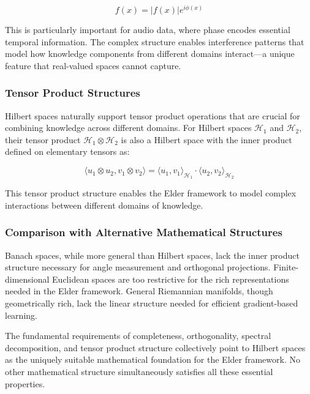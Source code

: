 \begin{equation}
f(x) = |f(x)| e^{i\phi(x)}
\end{equation}

This is particularly important for audio data, where phase encodes essential temporal information. The complex structure enables interference patterns that model how knowledge components from different domains interact—a unique feature that real-valued spaces cannot capture.

\subsubsection{Tensor Product Structures}

Hilbert spaces naturally support tensor product operations that are crucial for combining knowledge across different domains. For Hilbert spaces $\mathcal{H}_1$ and $\mathcal{H}_2$, their tensor product $\mathcal{H}_1 \otimes \mathcal{H}_2$ is also a Hilbert space with the inner product defined on elementary tensors as:

\begin{equation}
\langle u_1 \otimes u_2, v_1 \otimes v_2 \rangle = \langle u_1, v_1 \rangle_{\mathcal{H}_1} \cdot \langle u_2, v_2 \rangle_{\mathcal{H}_2}
\end{equation}

This tensor product structure enables the Elder framework to model complex interactions between different domains of knowledge.

\subsubsection{Comparison with Alternative Mathematical Structures}

Banach spaces, while more general than Hilbert spaces, lack the inner product structure necessary for angle measurement and orthogonal projections. Finite-dimensional Euclidean spaces are too restrictive for the rich representations needed in the Elder framework. General Riemannian manifolds, though geometrically rich, lack the linear structure needed for efficient gradient-based learning.

The fundamental requirements of completeness, orthogonality, spectral decomposition, and tensor product structure collectively point to Hilbert spaces as the uniquely suitable mathematical foundation for the Elder framework. No other mathematical structure simultaneously satisfies all these essential properties.

